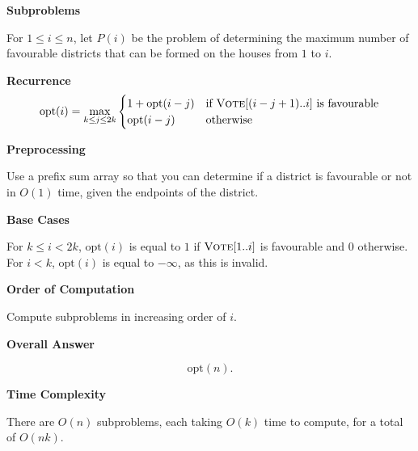 \documentclass{article}
\begin{document}
\pagebreak
\begin{solution}




\textbf{Subproblems}

For $1\leq i\leq n$, let $P(i)$ be the problem of determining the maximum 
number of favourable districts that can be formed on the houses from $1$ to $i$.

\textbf{Recurrence}
$$
\mathrm{opt}(i)=\max_{k\leq j \leq 2k}\begin{cases}
    1+\mathrm{opt}(i-j) &\text{if $\textsc{Vote}[(i-j+1)..i]$ is favourable}\\
    \mathrm{opt}(i-j) &\text{otherwise}
\end{cases}
$$

\textbf{Preprocessing}

Use a prefix sum array so that you can determine if a district is favourable 
or not in $O(1)$ time, given the endpoints of the district.

\textbf{Base Cases}

For $k\leq i<2k$, $\mathrm{opt}(i)$ is equal to $1$ if $\textsc{Vote}[1..i]$ is favourable and $0$ otherwise.
For $i < k$, $\mathrm{opt}(i)$ is equal to $-\infty$, as this is invalid. 

\textbf{Order of Computation}

Compute subproblems in increasing order of $i$.

\textbf{Overall Answer}

$$\mathrm{opt}(n).$$

\textbf{Time Complexity}

There are $O(n)$ subproblems, each taking $O(k)$ time to compute, for a total of $O(nk)$.

\end{solution}
\end{document}
